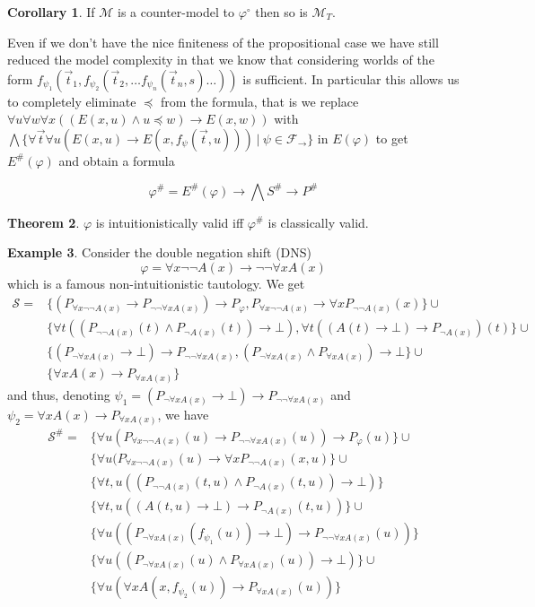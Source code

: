 \documentclass[a4paper,12pt]{report}
\theoremstyle{definition}
\newtheorem{theorem}{Theorem}[section]
\theoremstyle{definition}
\newtheorem{corollary}[theorem]{Corollary}
\theoremstyle{definition}
\theoremstyle{definition}
\theoremstyle{definition}
\theoremstyle{definition}
\newtheorem{example}[theorem]{Example}
\theoremstyle{definition}
\begin{document}
	
	\begin{corollary}
		If $\mathcal M$ is a counter-model to $\varphi^\circ$ then so is $\mathcal M_T$.
	\end{corollary}
	
	Even if we don't have the nice finiteness of the propositional case we have still reduced the model complexity in that we know that considering worlds of the form $f_{\psi_1}(\vec t_1, f_{\psi_2}(\vec t_2, \dots f_{\psi_n}(\vec t_n, s)\dots))$ is sufficient. In particular this allows us to completely eliminate $\preceq$ from the formula, that is we replace $\forall u\forall w\forall x((E(x, u)\wedge u\preceq w)\to E(x, w))$ with $\bigwedge\{\forall \vec t\forall u(E(x, u)\to E(x, f_\psi(\vec t, u)))\:|\:\psi\in\mathcal F_\to\}$ in $E(\varphi)$ to get $E^\#(\varphi)$ and obtain a formula
	
	$$\varphi^{\#} = E^\#(\varphi)\to \bigwedge S^\#\to P^\#$$

	\begin{theorem}
		$\varphi$ is intuitionistically valid iff $\varphi^\#$ is classically valid.
	\end{theorem}

	\begin{example}
		Consider the double negation shift (DNS)
		$$\varphi = \forall x\neg\neg A(x)\to \neg\neg\forall x A(x)$$
		which is a famous non-intuitionistic tautology. We get
		\begin{align*}
			\mathcal S = & \{(P_{\forall x\neg\neg A(x)}\to P_{\neg\neg\forall xA(x)})\to P_\varphi, P_{\forall x\neg\neg A(x)}\to \forall xP_{\neg\neg A(x)}(x)\}\cup\\
			             & \{\forall t((P_{\neg\neg A(x)}(t)\wedge P_{\neg A(x)}(t))\to \bot), \forall t((A(t)\to \bot)\to P_{\neg A(x)})(t)\}\cup\\
			             & \{(P_{\neg\forall xA(x)}\to \bot)\to P_{\neg\neg\forall xA(x)}, (P_{\neg\forall xA(x)}\wedge P_{\forall xA(x)})\to \bot\}\cup\\
			             &\{\forall xA(x)\to P_{\forall xA(x)}\}
		\end{align*}
		and thus, denoting $\psi_1 = (P_{\neg\forall xA(x)}\to \bot)\to P_{\neg\neg\forall xA(x)}$ and $\psi_2 = \forall xA(x)\to P_{\forall xA(x)}$, we have
			\begin{align*}
				\mathcal S^\# = & \{\forall u(P_{\forall x\neg\neg A(x)}(u)\to P_{\neg\neg\forall xA(x)}(u))\to P_\varphi(u)\}\cup\\& \{\forall u(P_{\forall x\neg\neg A(x)}(u)\to \forall xP_{\neg\neg A(x)}(x, u)\}\cup\\
				& \{\forall t, u((P_{\neg\neg A(x)}(t, u)\wedge P_{\neg A(x)}(t, u))\to \bot)\}\\& \{\forall t, u((A(t, u)\to \bot)\to P_{\neg A(x)}(t, u))\}\cup\\
				& \{\forall u((P_{\neg\forall xA(x)}(f_{\psi_1}(u))\to \bot)\to P_{\neg\neg\forall xA(x)}(u))\}\\& \{\forall u((P_{\neg\forall xA(x)}(u)\wedge P_{\forall xA(x)}(u))\to \bot)\}\cup\\
				&\{\forall u(\forall xA(x, f_{\psi_2}(u))\to P_{\forall xA(x)}(u))\}
			\end{align*}
	\end{example}
	
\end{document}
